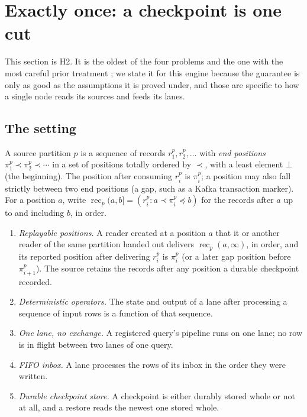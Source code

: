 \documentclass[11pt,a4paper]{article}
\renewcommand{\_}{\oldunderscore\allowbreak}
\newcommand{\rec}{\operatorname{rec}}
\newcommand{\defn}[1]{\emph{#1}}
\begin{document}
\section{Exactly once: a checkpoint is one cut}\label{sec:exactly-once}

This section is H2. It is the oldest of the four problems and the one with the most careful prior
treatment \cite{chandy1985,carbone2015abs,carbone2017}; we state it for this engine because the
guarantee is only as good as the assumptions it is proved under, and those are specific to how a
single node reads its sources and feeds its lanes.

\subsection{The setting}

\begin{definition}\label{def:log}
A source partition $p$ is a sequence of records $r^p_1, r^p_2, \ldots$ with \defn{end positions}
$\pi^p_1 \prec \pi^p_2 \prec \cdots$ in a set of positions totally ordered by $\prec$, with a least
element $\bot$ (the beginning). The position after consuming $r^p_i$ is $\pi^p_i$; a position may also
fall strictly between two end positions (a gap, such as a Kafka transaction marker). For a position
$a$, write $\rec_p(a, b] = (r^p_i : a \prec \pi^p_i \preceq b)$ for the records after $a$ up to and
including $b$, in order.
\end{definition}

\begin{assumption}\label{ass:eo}
\begin{enumerate}[label=(A\arabic*),leftmargin=*]
\item \emph{Replayable positions.} A reader created at a position $a$ that it or another reader of
      the same partition handed out delivers $\rec_p(a, \infty)$, in order, and its reported position
      after delivering $r^p_i$ is $\pi^p_i$ (or a later gap position before $\pi^p_{i+1}$). The source
      retains the records after any position a durable checkpoint recorded.
\item \emph{Deterministic operators.} The state and output of a lane after processing a sequence of
      input rows is a function of that sequence.
\item \emph{One lane, no exchange.} A registered query's pipeline runs on one lane; no row is in flight
      between two lanes of one query.
\item \emph{FIFO inbox.} A lane processes the rows of its inbox in the order they were written.
\item \emph{Durable checkpoint store.} A checkpoint is either durably stored whole or not at all, and a
      restore reads the newest one stored whole.
\end{enumerate}
\end{assumption}
\end{document}

